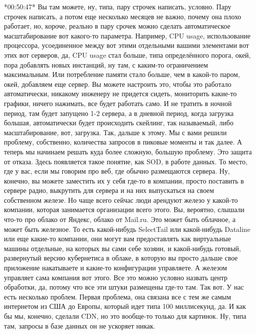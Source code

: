 \documentclass[12pt]{article} %
\begin{document}
*00:50:47*
Вы там можете, ну, типа, пару строчек написать, условно.  Пару строчек написать, а потом еще несколько месяцев не важно, почему она плохо работает, но, короче, реально в пару срочек можно сделать автоматическое масштабирование вот какого-то параметра.  Например, CPU usage, использование процессора, усоединенное между вот этими отдельными вашими элементами вот этих вот серверов, да, CPU usage стал больше, типа определённого порога, окей, пора добавлять новых инстанций, ну там, с каким-то ограничением максимальным.  Или потребление памяти стало больше, чем в какой-то паром, окей, добавляем еще сервер.  Вы можете настроить это, чтобы это работало автоматически, никакому инженеру не придется сидеть, мониторить какие-то графики, ничего нажимать, все будет работать само.  И не тратить в ночной период, там будет запущено 1-2 сервера, а в дневной период, когда загрузка большая, автоматически будет происходить скейлинг, так называемый, либо масштабирование, вот, загрузка.  Так, дальше к этому.  Мы с вами решили проблему, собственно, количества запросов в пиковые моменты и так далее.  А теперь мы начинаем решать куда более сложную, большую проблему.  Это защита от отказа.  Здесь появляется такое понятие, как SOD, в работе данных. То место, где у вас, если мы говорим про веб, где обычно размещаются сервера.  Ну, конечно, вы можете заместить их у себя где-то в компании, просто поставить в сервере радио, выкрутить для сервера и на них выпускаться на своем собственном железе.  Но чаще всего сейчас люди арендуют железо у какой-то компании, которая занимается организации всего этого. Вы, вероятно, слышали что-то про облако от Яндекс, облако от Mail.ru.  Это может быть облачное, а может быть железное.  То есть какой-нибудь SelectTail или какой-нибудь Dataline или еще какие-то компании, они могут вам предоставлять как виртуальные машины отдельные, на которых вы сами себе хозяин, и какой-нибудь готовый, развернутый версию кубернетиса в облаке, в которую вы просто дальше свое приложение накатываете и какие-то конфигурации управляете.  А железом управляет сама компания вот этого.  Все это можно условно назвать центр обработки, да, потому что все эти штуки размещены где-то там.  Так вот.  У нас есть несколько проблем.  Первая проблема, она связана все с тем же самым интернетом из США до Европы, который идет типа 100 миллисекунд, да.  И как бы мы, конечно, сделали CDN, но это вообще-то только для картинок.  Ну, типа там, запросы в базе данных он не ускоряет никак.
\end{document}
